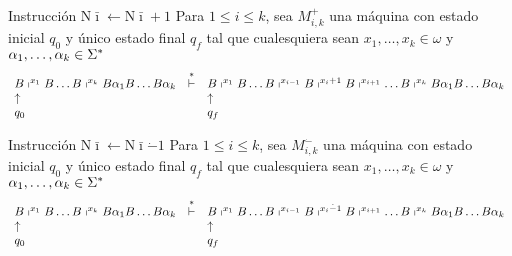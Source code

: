 \begin{frame}
	\begin{block}{Instrucción $\mathrm{N}\bar{\imath} \leftarrow \mathrm{N}\bar{\imath} + 1$}
		\PN Para $1 \leq i \leq k$, sea $M_{i,k}^{+}$ una máquina con estado inicial $q_{0}$ y único estado final $q_{f}$
		tal que cualesquiera sean $x_{1}, \dotsc, x_{k} \in \omega$ y $\alpha_{1}, \dotsc, \alpha_{k} \in \Sigma^{\ast}$
		\minLetter
		\[
			\begin{array}{lcl}
				B \shortmid^{x_{1}} B \dotsc B \shortmid^{x_{k}} B \alpha_{1} B \dotsc B \alpha_{k} &\overset{\ast}{\vdash}& B
				\shortmid^{x_{1}} B \dotsc B \shortmid^{x_{i-1}} B \shortmid^{x_{i}+1} B \shortmid^{x_{i+1}} \dotsc B
				\shortmid^{x_{k}} B \alpha_{1} B \dotsc B \alpha_{k} \\
				\uparrow && \uparrow \\
				q_{0} & & q_{f}
			\end{array}
		\]
	\end{block}

	\begin{block}{Instrucción $\mathrm{N}\bar{\imath} \leftarrow \mathrm{N}\bar{\imath} \dot{-} 1$}
		\PN Para $1 \leq i \leq k$, sea $M_{i,k}^{\dot{-}}$ una máquina con estado inicial $q_{0}$ y único estado final
		$q_{f}$ tal que cualesquiera sean $x_{1}, \dotsc, x_{k} \in \omega$ y $\alpha_{1}, \dotsc, \alpha_{k} \in \Sigma^{\ast}$
		\minLetter
		\[
			\begin{array}{lcl}
				B \shortmid^{x_{1}} B \dotsc B \shortmid^{x_{k}} B \alpha_{1} B \dotsc B \alpha_{k} &\overset{\ast}{\vdash}& B
					\shortmid^{x_{1}} B \dotsc B \shortmid^{x_{i-1}} B \shortmid^{x_{i} \dot{-} 1} B \shortmid^{x_{i+1}} \dotsc B
					\shortmid^{x_{k}} B \alpha_{1} B \dotsc B \alpha_{k} \\
				\uparrow && \uparrow \\
				q_{0} && q_{f}
			\end{array}
		\]
	\end{block}
\end{frame}
